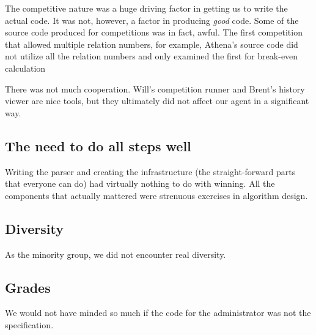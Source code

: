 \documentclass[letterpaper,12pt,oneside]{article}
\begin{document}
The competitive nature was a huge driving factor in getting us to write
the actual code. It was not, however, a factor in producing {\em good}
code. Some of the source code produced for competitions was in fact, awful. The
first competition that allowed multiple relation numbers, for example, Athena's
source code did not utilize all the relation numbers and only examined the first for break-even calculation

There was not much cooperation. Will's competition runner and Brent's
history viewer are nice tools, but they ultimately did not affect our
agent in a significant way.

\subsection{The need to do all steps well}

Writing the parser and creating the infrastructure (the straight-forward
parts that everyone can do) had virtually nothing to do with winning. All
the components that actually mattered were strenuous exercises in algorithm
design.

\subsection{Diversity}
% 

As the minority group, we did not encounter real diversity.

\subsection{Grades}

We would not have minded so much if the code for the administrator was not
the specification.
\end{document}
